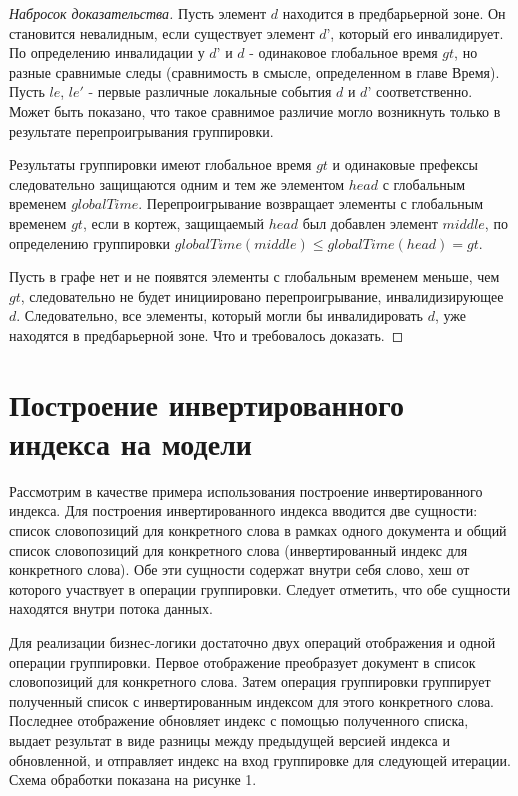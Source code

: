 \documentclass[14pt]{matmex-diploma-custom}
\begin{document}
\begin{proof}[Набросок доказательства]
Пусть элемент \(d\) находится в предбарьерной зоне. Он становится невалидным, если существует элемент \(d’\), который его инвалидирует. По определению инвалидации у \(d’\) и \(d\) - одинаковое глобальное время \(gt\), но разные сравнимые следы (сравнимость в смысле, определенном в главе Время). Пусть \(le\), \(le'\) - первые различные локальные события \(d\) и \(d’\) соответственно. Может быть показано, что такое сравнимое различие могло возникнуть только в результате перепроигрывания группировки.

Результаты группировки имеют глобальное время \(gt\) и одинаковые префексы следовательно защищаются одним и тем же элементом \(head\) с глобальным временем \(globalTime\). Перепроигрывание возвращает элементы с глобальным временем \(gt\), если в кортеж, защищаемый \(head\) был добавлен элемент \(middle\), по определению группировки \(globalTime(middle) \leq globalTime(head) = gt \).

Пусть в графе нет и не появятся элементы с глобальным временем меньше, чем \(gt\), следовательно не будет инициировано перепроигрывание, инвалидизирующее \(d\). Следовательно, все элементы, который могли бы инвалидировать \(d\), уже находятся в предбарьерной зоне. Что и требовалось доказать.
\end{proof}

\section{Построение инвертированного индекса на модели}

Рассмотрим в качестве примера использования построение инвертированного индекса. Для построения инвертированного индекса вводится две сущности: список словопозиций для конкретного слова в рамках одного документа и общий список словопозиций для конкретного слова (инвертированный индекс для конкретного слова). Обе эти сущности содержат внутри себя слово, хеш от которого участвует в операции группировки. Следует отметить, что обе сущности находятся внутри потока данных.

Для реализации бизнес-логики достаточно двух операций отображения и одной операции группировки. Первое отображение преобразует документ в список словопозиций для конкретного слова. Затем операция группировки группирует полученный список с инвертированным индексом для этого конкретного слова. Последнее отображение обновляет индекс с помощью полученного списка, выдает результат в виде разницы между предыдущей версией индекса и обновленной, и отправляет индекс на вход группировке для следующей итерации. Схема обработки показана на рисунке 1.
\end{document}

